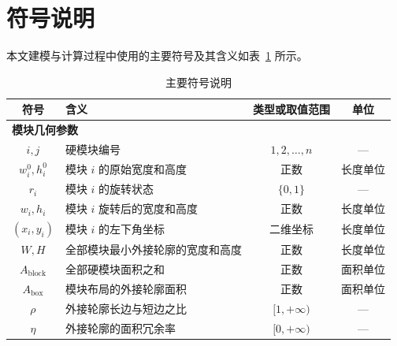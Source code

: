 \section{符号说明}

本文建模与计算过程中使用的主要符号及其含义如表~\ref{tab:main_symbols} 所示。

\begingroup
\footnotesize
\renewcommand{\arraystretch}{1.02}
\begin{table}[H]
\centering
\caption{主要符号说明}
\label{tab:main_symbols}
\begin{tabular}{c p{6.4cm} c c}
  \toprule
  符号 & 含义 & 类型或取值范围 & 单位 \\
  \midrule

  \multicolumn{4}{l}{\textbf{模块几何参数}}\\
  $i,j$ & 硬模块编号 & $1,2,\ldots,n$ & --- \\
  $w_i^0,h_i^0$ & 模块 $i$ 的原始宽度和高度 & 正数 & 长度单位 \\
  $r_i$ & 模块 $i$ 的旋转状态 & $\{0,1\}$ & --- \\
  $w_i,h_i$ & 模块 $i$ 旋转后的宽度和高度 & 正数 & 长度单位 \\
  $(x_i,y_i)$ & 模块 $i$ 的左下角坐标 & 二维坐标 & 长度单位 \\
  $W,H$ & 全部模块最小外接轮廓的宽度和高度 & 正数 & 长度单位 \\
  $A_{\mathrm{block}}$ & 全部硬模块面积之和 & 正数 & 面积单位 \\
  $A_{\mathrm{box}}$ & 模块布局的外接轮廓面积 & 正数 & 面积单位 \\
  $\rho$ & 外接轮廓长边与短边之比 & $[1,+\infty)$ & --- \\
  $\eta$ & 外接轮廓的面积冗余率 & $[0,+\infty)$ & --- \\
  \bottomrule
\end{tabular}
\end{table}

